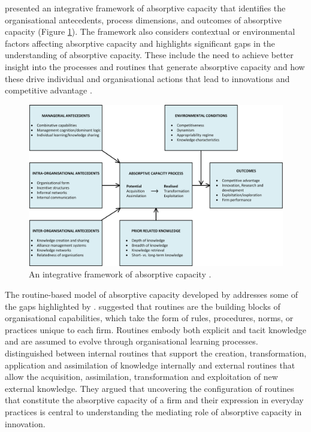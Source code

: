 \citet{volberda2010perspective} presented an integrative framework of absorptive capacity that identifies the organisational antecedents, process dimensions, and outcomes of absorptive capacity (Figure \ref{fig:volberdaintegrativemodel}). The framework also considers contextual or environmental factors affecting absorptive capacity and highlights significant gaps in the understanding of absorptive capacity. These include the need to achieve better insight into the processes and routines that generate absorptive capacity and how these drive individual and organisational actions that lead to innovations and competitive advantage \citep{volberda2010perspective}. \medskip

\begin{figure}
	\centering
	\includegraphics[width=1.0\linewidth]{Images/Volberda_Integrative_Model}
	\caption{An integrative framework of absorptive capacity \citep{volberda2010perspective}.}
	\label{fig:volberdaintegrativemodel}
\end{figure}

The routine-based model of absorptive capacity developed by \citet{lewin2011microfoundations} addresses some of the gaps highlighted by \citet{volberda2010perspective}. \citet{lewin2011microfoundations} suggested that routines are the building blocks of organisational capabilities, which take the form of rules, procedures, norms, or practices unique to each firm. Routines embody both explicit and tacit knowledge and are assumed to evolve through organisational learning processes. \citet{lewin2011microfoundations} distinguished between internal routines that support the creation, transformation, application and assimilation of knowledge internally and external routines that allow the acquisition, assimilation, transformation and exploitation of new external knowledge. They argued that uncovering the configuration of routines that constitute the absorptive capacity of a firm and their expression in everyday practices is central to understanding the mediating role of absorptive capacity in innovation. \medskip

